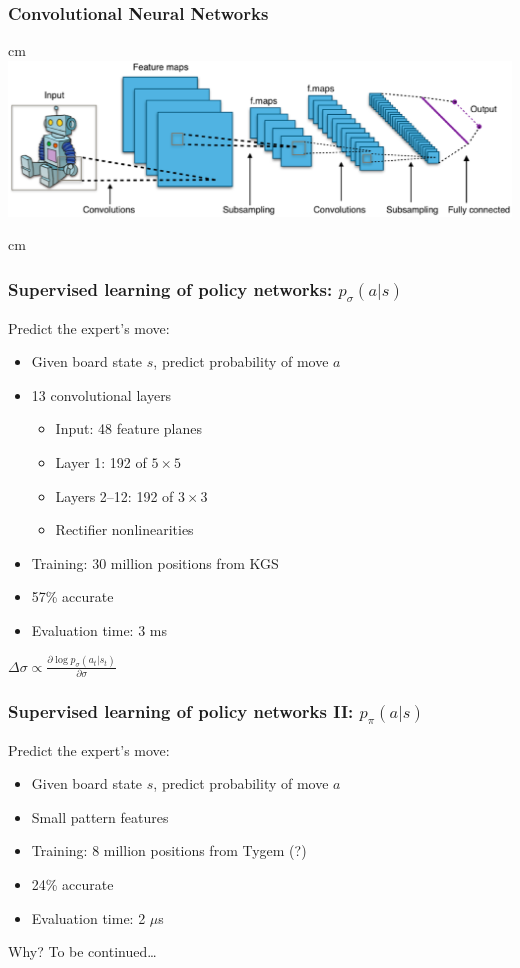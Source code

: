 \documentclass{beamer}
\begin{document}
\begin{frame}
  \frametitle{Convolutional Neural Networks}
   cm
  \includegraphics[width=\textwidth]{ConvolutionalNet}

   cm
  \begin{center}
    \href{http://yann.lecun.com/exdb/lenet/}{}
  \end{center}
\end{frame}

\begin{frame}
  \frametitle{Supervised learning of policy networks: $p_\sigma(a|s)$}
  Predict the expert's move:
  \begin{itemize}
  \item Given board state $s$, predict probability of move $a$
  \item 13 convolutional layers
    \begin{itemize}
    \item Input: 48 feature planes
    \item Layer 1: 192 of $5\times 5$
    \item Layers 2--12: 192 of $3\times 3$
    \item Rectifier nonlinearities
    \end{itemize}
  \item Training: 30 million positions from KGS
  \item 57\% accurate
  \item Evaluation time: 3 ms
  \end{itemize}
  \begin{tcolorbox}
    \begin{center}
      $\Delta \sigma \propto \frac{\partial \log p_\sigma(a_t|s_t)}{\partial \sigma}$
    \end{center}
  \end{tcolorbox}
\end{frame}

\begin{frame}
  \frametitle{Supervised learning of policy networks II: $p_\pi(a|s)$}
  Predict the expert's move:
  \begin{itemize}
  \item Given board state $s$, predict probability of move $a$
  \item Small pattern features
  \item Training: 8 million positions from Tygem (?)
  \item 24\% accurate
  \item Evaluation time: 2 $\mu$s
  \end{itemize}
  Why? To be continued\dots
\end{frame}
\end{document}
